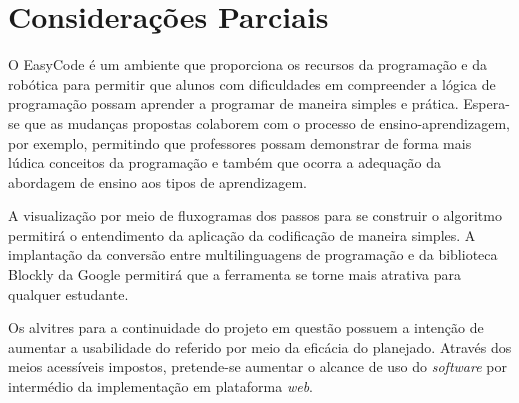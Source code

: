 \documentclass[12pt]{article}
\begin{document}
\section{Considerações Parciais}
O EasyCode é um ambiente que proporciona os recursos da programação e da robótica para permitir que alunos com dificuldades em compreender a lógica de programação possam aprender a programar de maneira simples e prática. Espera-se que as mudanças propostas colaborem com o processo de ensino-aprendizagem, por exemplo, permitindo que professores possam demonstrar de forma mais lúdica conceitos da programação e também que ocorra a adequação da abordagem de ensino aos tipos de aprendizagem. 
\par A visualização por meio de fluxogramas dos passos para se construir o algoritmo permitirá o entendimento da aplicação da codificação de maneira simples. A implantação da conversão entre multilinguagens de programação e da biblioteca Blockly da Google permitirá que a ferramenta se torne mais atrativa para qualquer estudante.
\par Os alvitres para a continuidade do projeto em questão possuem a intenção de aumentar a usabilidade do referido por meio da eficácia do planejado. Através dos meios acessíveis impostos, pretende-se aumentar o alcance de uso do \textit{software} por intermédio da implementação em plataforma \textit{web}.  



\end{document}
